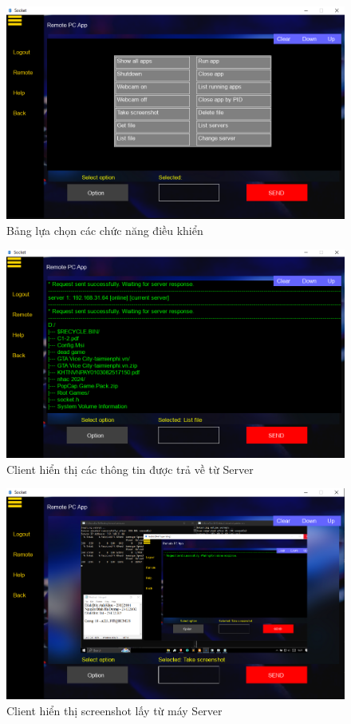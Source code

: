 \begin{figure}[H]
    \centering
    \includegraphics[width=0.93\linewidth]{img/options.png}
    \caption{Bảng lựa chọn các chức năng điều khiển}
\end{figure}

\begin{figure}[H]
    \centering
    \includegraphics[width=0.93\linewidth]{img/request.png}
    \caption{Client hiển thị các thông tin được trả về từ Server}
\end{figure}

\begin{figure}[H]
    \centering
    \includegraphics[width=0.93\linewidth]{img/screenshot.png}
    \caption{Client hiển thị screenshot lấy từ máy Server}
\end{figure}

